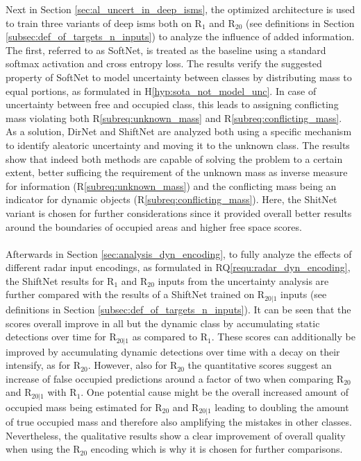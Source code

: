 Next in Section \ref{sec:al_uncert_in_deep_isms}, the optimized architecture is used to train three variants of deep \gls{ism}s both on R$_1$ and R$_{20}$ (see definitions in Section \ref{subsec:def_of_targets_n_inputs}) to analyze the influence of added information. The first, referred to as SoftNet, is treated as the baseline using a standard softmax activation and cross entropy loss. The results verify the suggested property of SoftNet to model uncertainty between classes by distributing mass to equal portions, as formulated in H\ref{hyp:sota_not_model_unc}. In case of uncertainty between free and occupied class, this leads to assigning conflicting mass violating both R\ref{subreq:unknown_mass} and R\ref{subreq:conflicting_mass}. As a solution, DirNet and ShiftNet are analyzed both using a specific mechanism to identify aleatoric uncertainty and moving it to the unknown class. The results show that indeed both methods are capable of solving the problem to a certain extent, better sufficing the requirement of the unknown mass as inverse measure for information (R\ref{subreq:unknown_mass}) and the conflicting mass being an indicator for dynamic objects (R\ref{subreq:conflicting_mass}). Here, the ShitNet variant is chosen for further considerations since it provided overall better results around the boundaries of occupied areas and higher free space scores.
\\\\
Afterwards in Section \ref{sec:analysis_dyn_encoding}, to fully analyze the effects of different radar input encodings, as formulated in RQ\ref{requ:radar_dyn_encoding}, the ShiftNet results for R$_1$ and R$_{20}$ inputs from the uncertainty analysis are further compared with the results of a ShiftNet trained on R$_{20|1}$ inputs (see definitions in Section \ref{subsec:def_of_targets_n_inputs}). It can be seen that the scores overall improve in all but the dynamic class by accumulating static detections over time for R$_{20|1}$ as compared to R$_1$. These scores can additionally be improved by accumulating dynamic detections over time with a decay on their intensify, as for R$_{20}$. However, also for R$_{20}$ the quantitative scores suggest an increase of false occupied predictions around a factor of two when comparing R$_{20}$ and R$_{20|1}$ with R$_1$. One potential cause might be the overall increased amount of occupied mass being estimated for R$_{20}$ and R$_{20|1}$ leading to doubling the amount of true occupied mass and therefore also amplifying the mistakes in other classes. Nevertheless, the qualitative results show a clear improvement of overall quality when using the R$_{20}$ encoding which is why it is chosen for further comparisons.
